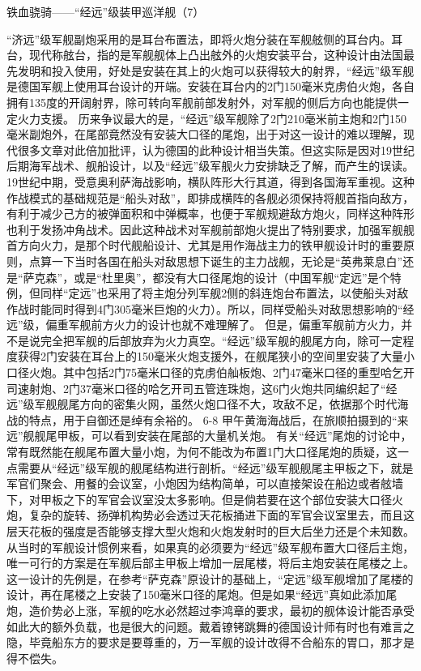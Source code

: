 \documentclass[12pt,UTF8]{ctexbook}
\begin{document}
铁血骁骑——“经远”级装甲巡洋舰（7）

“济远”级军舰副炮采用的是耳台布置法，即将火炮分装在军舰舷侧的耳台内。耳台，现代称舷台，指的是军舰舰体上凸出舷外的火炮安装平台，这种设计由法国最先发明和投入使用，好处是安装在其上的火炮可以获得较大的射界，“经远”级军舰是德国军舰上使用耳台设计的开端。安装在耳台内的2门150毫米克虏伯火炮，各自拥有135度的开阔射界，除可转向军舰前部发射外，对军舰的侧后方向也能提供一定火力支援。
历来争议最大的是，“经远”级军舰除了2门210毫米前主炮和2门150毫米副炮外，在尾部竟然没有安装大口径的尾炮，出于对这一设计的难以理解，现代很多文章对此倍加批评，认为德国的此种设计相当失策。但这实际是因对19世纪后期海军战术、舰船设计，以及“经远”级军舰火力安排缺乏了解，而产生的误读。
19世纪中期，受意奥利萨海战影响，横队阵形大行其道，得到各国海军重视。这种作战模式的基础规范是“船头对敌”，即排成横阵的各舰必须保持将舰首指向敌方，有利于减少己方的被弹面积和中弹概率，也便于军舰规避敌方炮火，同样这种阵形也利于发扬冲角战术。因此这种战术对军舰前部炮火提出了特别要求，加强军舰舰首方向火力，是那个时代舰船设计、尤其是用作海战主力的铁甲舰设计时的重要原则，点算一下当时各国在船头对敌思想下诞生的主力战舰，无论是“英弗莱息白”还是“萨克森”，或是“杜里奥”，都没有大口径尾炮的设计（中国军舰“定远”是个特例，但同样“定远”也采用了将主炮分列军舰2侧的斜连炮台布置法，以使船头对敌作战时能同时得到4门305毫米巨炮的火力）。所以，同样受船头对敌思想影响的“经远”级，偏重军舰前方火力的设计也就不难理解了。
但是，偏重军舰前方火力，并不是说完全把军舰的后部放弃为火力真空。“经远”级军舰的舰尾方向，除可一定程度获得2门安装在耳台上的150毫米火炮支援外，在舰尾狭小的空间里安装了大量小口径火炮。其中包括2门75毫米口径的克虏伯舢板炮、2门47毫米口径的重型哈乞开司速射炮、2门37毫米口径的哈乞开司五管连珠炮，这6门火炮共同编织起了“经远”级军舰舰尾方向的密集火网，虽然火炮口径不大，攻敌不足，依据那个时代海战的特点，用于自御还是绰有余裕的。
6-8
甲午黄海海战后，在旅顺拍摄到的“来远”舰舰尾甲板，可以看到安装在尾部的大量机关炮。
有关“经远”尾炮的讨论中，常有既然能在舰尾布置大量小炮，为何不能改为布置1门大口径尾炮的质疑，这一点需要从“经远”级军舰的舰尾结构进行剖析。“经远”级军舰舰尾主甲板之下，就是军官们聚会、用餐的会议室，小炮因为结构简单，可以直接架设在船边或者舷墙下，对甲板之下的军官会议室没太多影响。但是倘若要在这个部位安装大口径火炮，复杂的旋转、扬弹机构势必会透过天花板捅进下面的军官会议室里去，而且这层天花板的强度是否能够支撑大型火炮和火炮发射时的巨大后坐力还是个未知数。从当时的军舰设计惯例来看，如果真的必须要为“经远”级军舰布置大口径后主炮，唯一可行的方案是在军舰后部主甲板上增加一层尾楼，将后主炮安装在尾楼之上。这一设计的先例是，在参考“萨克森”原设计的基础上，“定远”级军舰增加了尾楼的设计，再在尾楼之上安装了150毫米口径的尾炮。但是如果“经远”真如此添加尾炮，造价势必上涨，军舰的吃水必然超过李鸿章的要求，最初的舰体设计能否承受如此大的额外负载，也是很大的问题。戴着镣铐跳舞的德国设计师有时也有难言之隐，毕竟船东方的要求是要尊重的，万一军舰的设计改得不合船东的胃口，那才是得不偿失。
\end{document}
